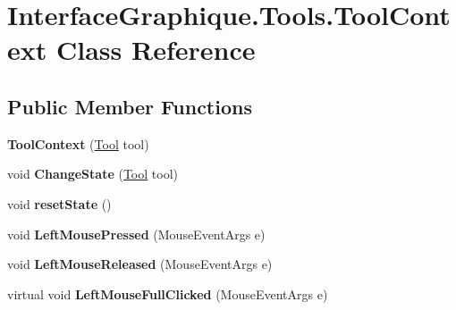 \hypertarget{class_interface_graphique_1_1_tools_1_1_tool_context}{}\section{Interface\+Graphique.\+Tools.\+Tool\+Context Class Reference}
\label{class_interface_graphique_1_1_tools_1_1_tool_context}
\subsection*{Public Member Functions}
\begin{DoxyCompactItemize}
\item 
\hypertarget{class_interface_graphique_1_1_tools_1_1_tool_context_a344706278b7042c8acdbdd20b98fc5e3}{}{\bfseries Tool\+Context} (\hyperlink{class_interface_graphique_1_1_tools_1_1_tool}{Tool} tool)\label{class_interface_graphique_1_1_tools_1_1_tool_context_a344706278b7042c8acdbdd20b98fc5e3}

\item 
\hypertarget{class_interface_graphique_1_1_tools_1_1_tool_context_ac00366c0aa9ee6f0ac88e13e60ae8a1d}{}void {\bfseries Change\+State} (\hyperlink{class_interface_graphique_1_1_tools_1_1_tool}{Tool} tool)\label{class_interface_graphique_1_1_tools_1_1_tool_context_ac00366c0aa9ee6f0ac88e13e60ae8a1d}

\item 
\hypertarget{class_interface_graphique_1_1_tools_1_1_tool_context_afbfa4605a9ae00cb0af6e8cec4408d48}{}void {\bfseries reset\+State} ()\label{class_interface_graphique_1_1_tools_1_1_tool_context_afbfa4605a9ae00cb0af6e8cec4408d48}

\item 
\hypertarget{class_interface_graphique_1_1_tools_1_1_tool_context_ae6f1018d7fced0174117b743a7f364c2}{}void {\bfseries Left\+Mouse\+Pressed} (Mouse\+Event\+Args e)\label{class_interface_graphique_1_1_tools_1_1_tool_context_ae6f1018d7fced0174117b743a7f364c2}

\item 
\hypertarget{class_interface_graphique_1_1_tools_1_1_tool_context_aaf635594794be1e8411d70f74a04e95b}{}void {\bfseries Left\+Mouse\+Released} (Mouse\+Event\+Args e)\label{class_interface_graphique_1_1_tools_1_1_tool_context_aaf635594794be1e8411d70f74a04e95b}

\item 
\hypertarget{class_interface_graphique_1_1_tools_1_1_tool_context_ac0a95579ead49355c664ef1cce5fbbf6}{}virtual void {\bfseries Left\+Mouse\+Full\+Clicked} (Mouse\+Event\+Args e)\label{class_interface_graphique_1_1_tools_1_1_tool_context_ac0a95579ead49355c664ef1cce5fbbf6}


\end{DoxyCompactItemize}
